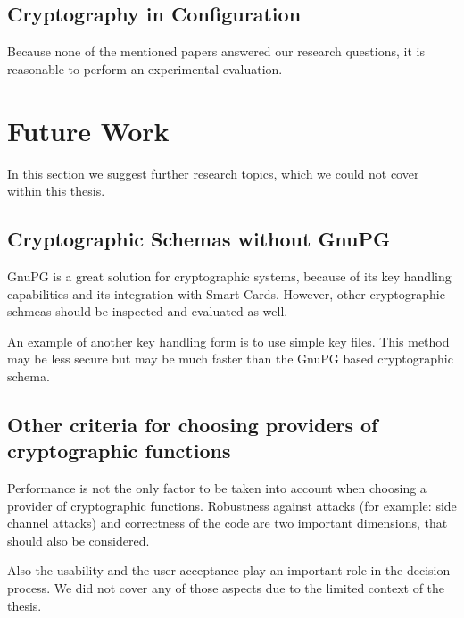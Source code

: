 	\subsection{Cryptography in Configuration}

Because none of the mentioned papers answered our research questions, it is reasonable to perform an experimental evaluation.

\section{Future Work}

In this section we suggest further research topics, which we could not cover within this thesis.

	\subsection{Cryptographic Schemas without GnuPG}

GnuPG is a great solution for cryptographic systems, because of its key handling capabilities and its integration with Smart Cards.
However, other cryptographic schmeas should be inspected and evaluated as well.

An example of another key handling form is to use simple key files.
This method may be less secure but may be much faster than the GnuPG based cryptographic schema.

	\subsection{Other criteria for choosing providers of cryptographic functions}

Performance is not the only factor to be taken into account when choosing a provider of cryptographic functions.
Robustness against attacks (for example: side channel attacks) and correctness of the code are two important dimensions, that should also be considered.

Also the usability and the user acceptance play an important role in the decision process.
We did not cover any of those aspects due to the limited context of the thesis.
